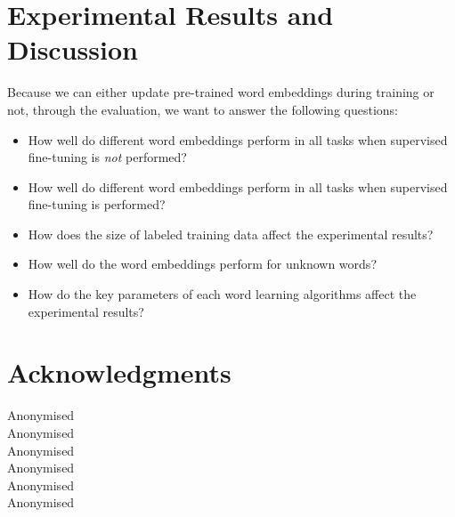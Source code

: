 \documentclass[11pt]{article}
\begin{document}

\section{Experimental Results and Discussion}



Because we can either update pre-trained word embeddings during training or not, through the evaluation, we want to answer the following questions:
\begin{itemize}
\item How well do different word embeddings perform in all tasks when supervised fine-tuning is \textit{not} performed?
\item How well do different word embeddings perform in all tasks when supervised fine-tuning is performed?
\item How does the size of labeled training data affect the experimental results?
\item How well do the word embeddings perform for unknown words? 
\item How do the key parameters of each word learning algorithms affect the experimental results?
\end{itemize}



\section*{Acknowledgments}

Anonymised\\
Anonymised\\
Anonymised\\
Anonymised\\
Anonymised\\
Anonymised\\




\end{document}

